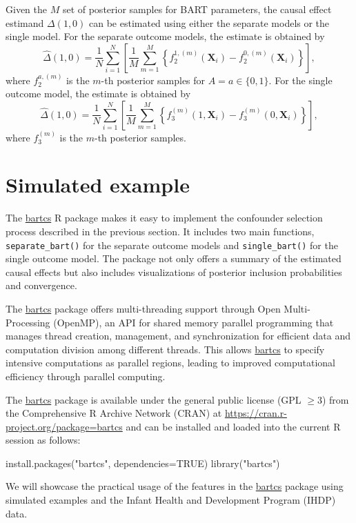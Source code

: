  
 
Given the $M$ set of posterior samples for BART parameters, the causal effect estimand $\Delta(1, 0)$ can be estimated using either the separate models or the single model.
For the separate outcome models, the estimate is obtained by
\[\hat{\Delta}(1,0) = \frac{1}{N} \sum_{i=1}^N\left[\frac{1}{M} \sum_{m=1}^M \left\{f_2^{1,(m)}(\boldsymbol{X}_i) - f_2^{0,(m)}(\boldsymbol{X}_i) \right\}\right],\]
where $f_2^{a,(m)}$ is the $m$-th posterior samples for $A = a\in\{0, 1\}$.
For the single outcome model, the estimate is obtained by
\[\hat{\Delta}(1,0) = \frac{1}{N} \sum_{i=1}^N\left[\frac{1}{M} \sum_{m=1}^M \left\{f_3^{(m)}(1, \boldsymbol{X}_i) - f_3^{(m)}(0, \boldsymbol{X}_i)\right\}\right],\]
where $f_3^{(m)}$ is the $m$-th posterior samples.


\section{Simulated example} \label{sec:simulated}
The \href{https://CRAN.R-project.org/package=bartcs}{bartcs} R package makes it easy to implement the confounder selection process described in the previous section. It includes two main functions, \verb|separate_bart()| for the separate outcome models and \verb|single_bart()| for the single outcome model. The package not only offers a summary of the estimated causal effects but also includes visualizations of posterior inclusion probabilities and convergence.

The \href{https://CRAN.R-project.org/package=bartcs}{bartcs} package offers multi-threading support through Open Multi-Processing (OpenMP), an API for shared memory parallel programming that manages thread creation, management, and synchronization for efficient data and computation division among different threads. This allows \href{https://CRAN.R-project.org/package=bartcs}{bartcs} to specify intensive computations as parallel regions, leading to improved computational efficiency through parallel computing.

The \href{https://CRAN.R-project.org/package=bartcs}{bartcs} package is available under the general public license (GPL $\geq3$) from the Comprehensive R Archive Network (CRAN) at \href{https://CRAN.R-project.org/package=bartcs}{https://cran.r-project.org/package=bartcs} and can be installed and loaded into the current R session as follows:
\begin{example}
install.packages("bartcs", dependencies=TRUE)
library("bartcs")
\end{example}
We will showcase the practical usage of the features in the \href{https://CRAN.R-project.org/package=bartcs}{bartcs} package using simulated examples and the Infant Health and Development Program (IHDP) data.


